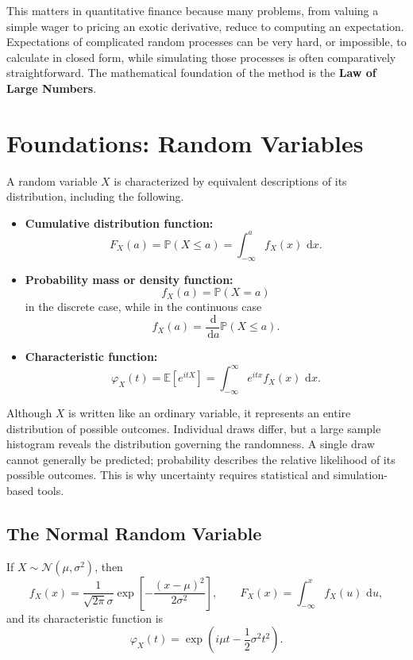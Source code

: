 \documentclass[12pt,openany]{book}
\theoremstyle{definition}
\theoremstyle{remark}
\newcommand{\E}{\mathbb{E}}
\newcommand{\Prob}{\mathbb{P}}
\newcommand{\dd}{\,\mathrm{d}}
\begin{document}
This matters in quantitative finance because many problems, from valuing a
simple wager to pricing an exotic derivative, reduce to computing an
expectation. Expectations of complicated random processes can be very hard,
or impossible, to calculate in closed form, while simulating those processes
is often comparatively straightforward. The mathematical foundation of the
method is the \textbf{Law of Large Numbers}.

\section{Foundations: Random Variables}

A random variable \(X\) is characterized by equivalent descriptions of its
distribution, including the following.

\begin{itemize}
    \item \textbf{Cumulative distribution function:}
    \[
    F_X(a)=\Prob(X\leq a)
          =\int_{-\infty}^{a}f_X(x)\,\dd x.
    \]

    \item \textbf{Probability mass or density function:}
    \[
    f_X(a)=\Prob(X=a)
    \]
    in the discrete case, while in the continuous case
    \[
    f_X(a)=\frac{\dd}{\dd a}\Prob(X\leq a).
    \]

    \item \textbf{Characteristic function:}
    \[
    \varphi_X(t)
    =\E[e^{itX}]
    =\int_{-\infty}^{\infty}e^{itx}f_X(x)\,\dd x.
    \]
\end{itemize}

Although \(X\) is written like an ordinary variable, it represents an entire
distribution of possible outcomes. Individual draws differ, but a large
sample histogram reveals the distribution governing the randomness. A
single draw cannot generally be predicted; probability describes the
relative likelihood of its possible outcomes. This is why uncertainty
requires statistical and simulation-based tools.

\subsection{The Normal Random Variable}

If \(X\sim\mathcal{N}(\mu,\sigma^2)\), then
\[
f_X(x)
=\frac{1}{\sqrt{2\pi}\sigma}
 \exp\!\left[-\frac{(x-\mu)^2}{2\sigma^2}\right],
\qquad
F_X(x)=\int_{-\infty}^{x}f_X(u)\,\dd u,
\]
and its characteristic function is
\[
\varphi_X(t)
=\exp\!\left(i\mu t-\frac12\sigma^2t^2\right).
\]
\end{document}
